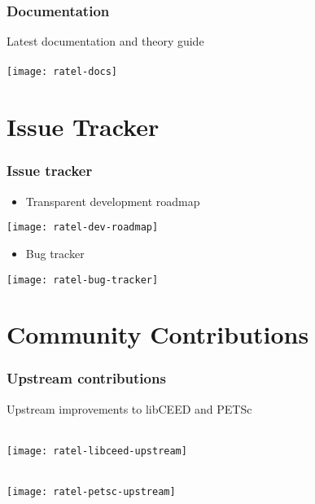 \documentclass{beamer}
\begin{document}

\begin{frame}
\begin{center}
\frametitle{Documentation}

Latest documentation and theory guide\\

~\\

\texttt{[image: ratel-docs]}

\end{center}
\end{frame}

\section{Issue Tracker}

\begin{frame}
\begin{center}
\frametitle{Issue tracker}

\begin{itemize}

\item Transparent development roadmap\\

\end{itemize}

\texttt{[image: ratel-dev-roadmap]}

\begin{itemize}

\item Bug tracker\\

\end{itemize}

\texttt{[image: ratel-bug-tracker]}

\end{center}
\end{frame}

\section{Community Contributions}

\begin{frame}
\begin{center}
\frametitle{Upstream contributions}

Upstream improvements to libCEED and PETSc

~\\

\texttt{[image: ratel-libceed-upstream]}

~\\

\texttt{[image: ratel-petsc-upstream]}

\end{center}
\end{frame}
 
\end{document}
